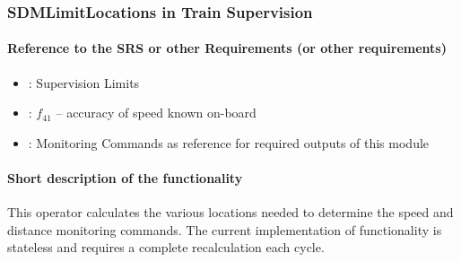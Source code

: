 \subsubsection{SDMLimitLocations in Train Supervision} 
\paragraph{Reference to the SRS or other Requirements (or other requirements)}
\begin{itemize}
	\item \cite[Chapt.~3.13.9]{subset-026}: Supervision Limits 
	\item \cite[Chapt.~5.3.1.2]{subset-041}: $f_{41}$ -- accuracy of speed known on-board
	\item \cite[Chapt.~3.13.10]{subset-026}: Monitoring Commands as reference for required outputs of this module
\end{itemize}

\paragraph{Short description of the functionality}
This operator calculates the various locations needed to determine the speed and distance monitoring commands. The current implementation of functionality is stateless and requires a complete recalculation each cycle.

